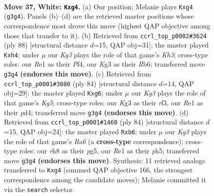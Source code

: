 \documentclass[11pt]{article}
\begin{document}
\clearpage

\begin{figure}[p]\centering
\begin{subfigure}{0.46\textwidth}\centering
\resizebox{\linewidth}{!}{%
\newchessgame
\chessboard[
  setfen={7r/6k1/8/8/p5p1/P5K1/7P/4R3 w - - 8 37},
  showmover=false,
  pgfstyle=straightmove, color=movearrow, markmove={g3-g4}
]}
\caption{}
\end{subfigure}\hfill
\begin{subfigure}{0.46\textwidth}\centering
\resizebox{\linewidth}{!}{%
\newchessgame
\chessboard[
  setfen={8/1p4k1/1R6/8/5P1p/7K/r6P/8 w - - 0 45},
  showmover=false,
  pgfstyle=straightmove, color=movearrow, markmove={h3-h4}
]}
\caption{}
\end{subfigure}
\\[4pt]
\begin{subfigure}{0.46\textwidth}\centering
\resizebox{\linewidth}{!}{%
\newchessgame
\chessboard[
  setfen={8/3R4/6p1/2k3K1/3p1PP1/5r2/8/8 w - - 1 43},
  showmover=false,
  pgfstyle=straightmove, color=movearrow, markmove={g5-g6}
]}
\caption{}
\end{subfigure}\hfill
\begin{subfigure}{0.46\textwidth}\centering
\resizebox{\linewidth}{!}{%
\newchessgame
\chessboard[
  setfen={8/3r4/Rp1P4/5kpp/P7/5K2/8/8 w - - 0 43},
  showmover=false,
  pgfstyle=straightmove, color=movearrow, markmove={a6-b6}
]}
\caption{}
\end{subfigure}
\caption{\textbf{Move 37, White: \texttt{Kxg4}.} (a) Our position; Melanie plays \texttt{Kxg4} (\texttt{g3g4}). Panels (b)--(d) are the retrieved master positions whose correspondence most drove this move (highest QAP objective among those that transfer to it). (b) Retrieved from \texttt{ccrl\_top\_p0002\#3624} (ply 88) [structural distance $d$=15, QAP obj=31]: the master played \texttt{Kxh4}; under $\mu$ our \emph{Kg3} plays the role of that game's \emph{Kh3}; cross-type roles: our \emph{R}e1 as their \emph{P}f4, our \emph{K}g3 as their \emph{R}b6; transferred move \texttt{g3g4} \textbf{(endorses this move)}. (c) Retrieved from \texttt{ccrl\_top\_p0001\#3080} (ply 84) [structural distance $d$=14, QAP obj=29]: the master played \texttt{Kxg6}; under $\mu$ our \emph{Kg3} plays the role of that game's \emph{Kg5}; cross-type roles: our \emph{K}g3 as their \emph{r}f3, our \emph{R}e1 as their \emph{p}d4; transferred move \texttt{g3g4} \textbf{(endorses this move)}. (d) Retrieved from \texttt{ccrl\_top\_p0001\#1460} (ply 84) [structural distance $d$=15, QAP obj=24]: the master played \texttt{Rxb6}; under $\mu$ our \emph{Kg3} plays the role of that game's \emph{Ra6} (a \textbf{cross-type} correspondence); cross-type roles: our \emph{r}h8 as their \emph{p}g5, our \emph{R}e1 as their \emph{p}h5; transferred move \texttt{g3g4} \textbf{(endorses this move)}. Synthesis: 11 retrieved analogs transferred to \texttt{Kxg4} (summed QAP objective 166, the strongest correspondence among the candidate moves); Melanie committed it via the \texttt{search} selector.}
\label{fig:thought-m72}
\end{figure}
\end{document}
